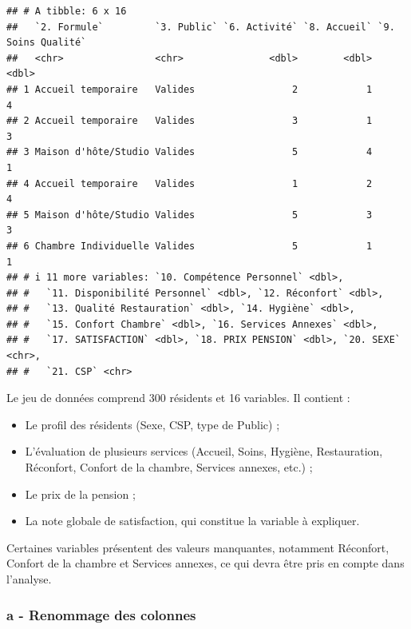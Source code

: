 \documentclass[
]{article}
\providecommand{\tightlist}{%
  \setlength{\itemsep}{0pt}\setlength{\parskip}{0pt}}
\begin{document}
\begin{verbatim}
## # A tibble: 6 x 16
##   `2. Formule`         `3. Public` `6. Activité` `8. Accueil` `9. Soins Qualité`
##   <chr>                <chr>               <dbl>        <dbl>              <dbl>
## 1 Accueil temporaire   Valides                 2            1                  4
## 2 Accueil temporaire   Valides                 3            1                  3
## 3 Maison d'hôte/Studio Valides                 5            4                  1
## 4 Accueil temporaire   Valides                 1            2                  4
## 5 Maison d'hôte/Studio Valides                 5            3                  3
## 6 Chambre Individuelle Valides                 5            1                  1
## # i 11 more variables: `10. Compétence Personnel` <dbl>,
## #   `11. Disponibilité Personnel` <dbl>, `12. Réconfort` <dbl>,
## #   `13. Qualité Restauration` <dbl>, `14. Hygiène` <dbl>,
## #   `15. Confort Chambre` <dbl>, `16. Services Annexes` <dbl>,
## #   `17. SATISFACTION` <dbl>, `18. PRIX PENSION` <dbl>, `20. SEXE` <chr>,
## #   `21. CSP` <chr>
\end{verbatim}

Le jeu de données comprend 300 résidents et 16 variables. Il contient :

\begin{itemize}
\tightlist
\item
  Le profil des résidents (Sexe, CSP, type de Public) ;
\item
  L'évaluation de plusieurs services (Accueil, Soins, Hygiène,
  Restauration, Réconfort, Confort de la chambre, Services annexes,
  etc.) ;
\item
  Le prix de la pension ;
\item
  La note globale de satisfaction, qui constitue la variable à
  expliquer.
\end{itemize}

Certaines variables présentent des valeurs manquantes, notamment
Réconfort, Confort de la chambre et Services annexes, ce qui devra être
pris en compte dans l'analyse.

\subsubsection{a - Renommage des
colonnes}\label{a---renommage-des-colonnes}
\end{document}
